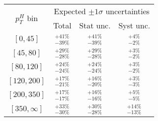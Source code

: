 \begin{tabular}{c|ccc}
  \multirow{2}{*}{$p_T^H$ bin} & \multicolumn{3}{c}{Expected $\pm1\sigma$ uncertainties} \\ 
  & Total & Stat unc. & Syst unc. \\ \hline 
  $[0,45]$  & $^{+41\%}_{-39\%}$ & $^{+41\%}_{-39\%}$ & $^{+4\%}_{-2\%}$ \\
  $[45,80]$  & $^{+29\%}_{-28\%}$ & $^{+29\%}_{-28\%}$ & $^{+3\%}_{-2\%}$ \\
  $[80,120]$  & $^{+24\%}_{-24\%}$ & $^{+24\%}_{-24\%}$ & $^{+3\%}_{-2\%}$ \\
  $[120,200]$  & $^{+17\%}_{-21\%}$ & $^{+16\%}_{-20\%}$ & $^{+3\%}_{-3\%}$ \\
  $[200,350]$  & $^{+17\%}_{-17\%}$ & $^{+16\%}_{-16\%}$ & $^{+5\%}_{-5\%}$ \\
  $[350,\infty]$  & $^{+33\%}_{-30\%}$ & $^{+30\%}_{-28\%}$ & $^{+14\%}_{-13\%}$ \\
\end{tabular}